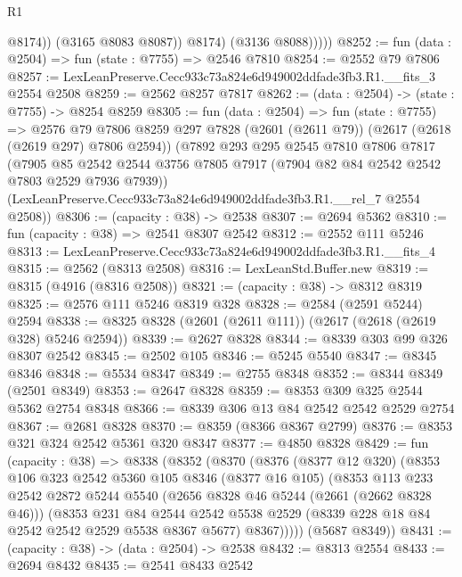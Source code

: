 \begin{lexlean}{R1}
\begin{coremodule}
                    @8174))
                (@3165 @8083 @8087))
              @8174)
            (@3136 @8088)))))
@8252 := fun (data : @2504) => fun (state : @7755) => @2546 @7810
@8254 := @2552 @79 @7806
@8257 := LexLeanPreserve.Cecc933c73a824e6d949002ddfade3fb3.R1.__fits_3 @2554 @2508
@8259 := @2562 @8257 @7817
@8262 := (data : @2504) -> (state : @7755) -> @8254 @8259
@8305 := fun (data : @2504) =>
  fun (state : @7755) =>
  @2576
    @79
    @7806
    @8259
    @297
    @7828
    (@2601 (@2611 @79))
    (@2617 (@2618 (@2619 @297) @7806 @2594))
    (@7892
      @293
      @295
      @2545
      @7810
      @7806
      @7817
      (@7905 @85 @2542 @2544 @3756 @7805 @7917 (@7904 @82 @84 @2542 @2542 @7803 @2529 @7936 @7939))
      (LexLeanPreserve.Cecc933c73a824e6d949002ddfade3fb3.R1.__rel_7 @2554 @2508))
@8306 := (capacity : @38) -> @2538
@8307 := @2694 @5362
@8310 := fun (capacity : @38) => @2541 @8307 @2542
@8312 := @2552 @111 @5246
@8313 := LexLeanPreserve.Cecc933c73a824e6d949002ddfade3fb3.R1.__fits_4
@8315 := @2562 (@8313 @2508)
@8316 := LexLeanStd.Buffer.new
@8319 := @8315 (@4916 (@8316 @2508))
@8321 := (capacity : @38) -> @8312 @8319
@8325 := @2576 @111 @5246 @8319 @328
@8328 := @2584 (@2591 @5244) @2594
@8338 := @8325 @8328 (@2601 (@2611 @111)) (@2617 (@2618 (@2619 @328) @5246 @2594))
@8339 := @2627 @8328
@8344 := @8339 @303 @99 @326 @8307 @2542
@8345 := @2502 @105
@8346 := @5245 @5540
@8347 := @8345 @8346
@8348 := @5534 @8347
@8349 := @2755 @8348
@8352 := @8344 @8349 (@2501 @8349)
@8353 := @2647 @8328
@8359 := @8353 @309 @325 @2544 @5362 @2754 @8348
@8366 := @8339 @306 @13 @84 @2542 @2542 @2529 @2754
@8367 := @2681 @8328
@8370 := @8359 (@8366 @8367 @2799)
@8376 := @8353 @321 @324 @2542 @5361 @320 @8347
@8377 := @4850 @8328
@8429 := fun (capacity : @38) =>
  @8338
    (@8352
      (@8370
        (@8376
          (@8377 @12 @320)
          (@8353
            @106
            @323
            @2542
            @5360
            @105
            @8346
            (@8377 @16 @105)
            (@8353
              @113
              @233
              @2542
              @2872
              @5244
              @5540
              (@2656 @8328 @46 @5244 (@2661 (@2662 @8328 @46)))
              (@8353
                @231
                @84
                @2544
                @2542
                @5538
                @2529
                (@8339 @228 @18 @84 @2542 @2542 @2529 @5538 @8367 @5677)
                @8367)))))
      (@5687 @8349))
@8431 := (capacity : @38) -> (data : @2504) -> @2538
@8432 := @8313 @2554
@8433 := @2694 @8432
@8435 := @2541 @8433 @2542

\end{coremodule}
\end{lexlean}
